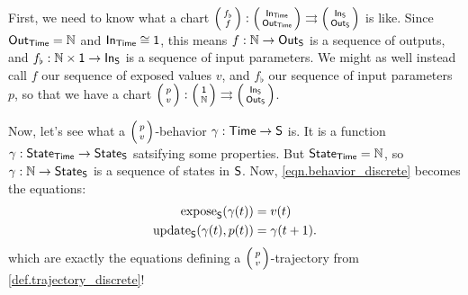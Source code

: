 \documentclass[DynamicalBook]{subfiles}
\begin{document}
\begin{example}
First, we need to know what a chart $\lens{f_{\flat}}{f} :
\lens{\In{Time}}{\Out{Time}} \rightrightarrows \lens{\In{S}}{\Out{S}}$ is like. Since
$\mathsf{Out}_{\mathsf{Time}} = \mathbb{N}$ and $\mathsf{In}_{\mathsf{Time}} \cong \mathsf{1}$, this means $f : \mathbb{N} \to \mathsf{Out}_{\mathsf{S}}$
is a sequence of outputs, and $f_{\flat} : \mathbb{N} \times \mathsf{1} \to \mathsf{In}_{\mathsf{S}}$ is a
sequence of input parameters. We might as well instead call $f$ our sequence of
exposed values $v$, and $f_{\flat}$ our sequence of input parameters $p$, so
that we have a chart $\lens{p}{v} : \lens{\ord{1}}{\nn}
\rightrightarrows \lens{\In{S}}{\Out{S}}$.

Now, let's see what a $\lens{p}{v}$-behavior $\gamma : \mathsf{Time} \to \mathsf{S}$ is. It
is a function $\gamma
: \mathsf{State}_{\mathsf{Time}} \to 
\mathsf{State}_{\mathsf{S}}$ satsifying some properties. But $\mathsf{State}_{\mathsf{Time}} = \mathbb{N}$, so $\gamma :
\mathbb{N} \to \mathsf{State}_{\mathsf{S}}$ is a sequence of states in $\mathsf{S}$. Now,
\cref{eqn.behavior_discrete} becomes the equations:
\begin{align*}
  \mathrm{expose}_{\mathsf{S}}(\gamma(t)) &= v(t) \\
  \mathrm{update}_{\mathsf{S}}(\gamma(t), p(t)) &= \gamma(t + 1).
\end{align*}
which are exactly the equations defining a $\lens{p}{v}$-trajectory from \cref{def.trajectory_discrete}!

\end{example}
\end{document}

